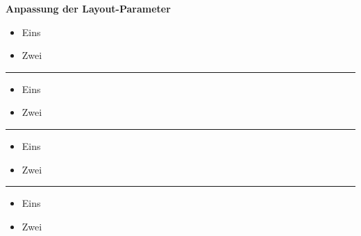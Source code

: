 \documentclass[a5paper]{article}
\begin{document}
\textbf{Anpassung der Layout-Parameter}


\begin{itemize}
\item Eins
\item Zwei
\end{itemize}

\hrule

\begin{itemize}
\setlength{\itemindent}{0em}
\item Eins
\item Zwei
\end{itemize}

\hrule

\begin{itemize}
\setlength{\itemindent}{2em}
\item Eins
\item Zwei
\end{itemize}

\hrule

\begin{itemize}
\setlength{\itemindent}{-2em}
\item Eins
\item Zwei
\end{itemize}
\end{document}
